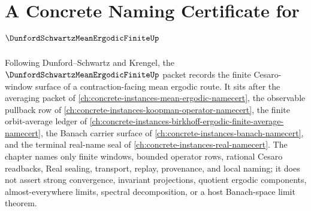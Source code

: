 \chapter{A Concrete Naming Certificate for $\DunfordSchwartzMeanErgodicFiniteUp$}
\label{ch:concrete-instances-dunford-schwartz-mean-ergodic-finite-namecert}

Following Dunford--Schwartz and Krengel, the $\DunfordSchwartzMeanErgodicFiniteUp$ packet records the finite Cesaro-window surface of a contraction-facing mean ergodic route. It sits after the averaging packet of \autoref{ch:concrete-instances-mean-ergodic-namecert}, the observable pullback row of \autoref{ch:concrete-instances-koopman-operator-namecert}, the finite orbit-average ledger of \autoref{ch:concrete-instances-birkhoff-ergodic-finite-average-namecert}, the Banach carrier surface of \autoref{ch:concrete-instances-banach-namecert}, and the terminal real-name seal of \autoref{ch:concrete-instances-real-namecert}. The chapter names only finite windows, bounded operator rows, rational Cesaro readbacks, Real sealing, transport, replay, provenance, and local naming; it does not assert strong convergence, invariant projections, quotient ergodic components, almost-everywhere limits, spectral decomposition, or a host Banach-space limit theorem.

